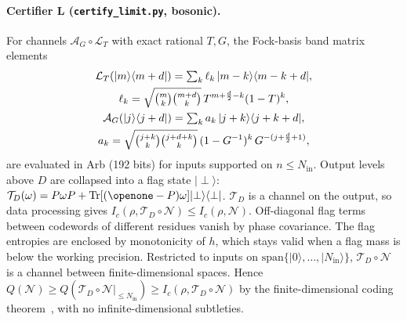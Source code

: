 \documentclass[aps,pra,reprint,superscriptaddress,nofootinbib,longbibliography,floatfix]{revtex4-2}
\theoremstyle{remark}
\newcommand{\ket}[1]{\lvert #1\rangle}
\newcommand{\bra}[1]{\langle #1\rvert}
\newcommand{\Tr}{\operatorname{Tr}}
\newcommand{\one}{\openone}
\newcommand{\Ic}{I_c}
\newcommand{\Amp}{\mathcal{A}}
\newcommand{\Loss}{\mathcal{L}}
\begin{document}
\paragraph*{Certifier L (\texttt{certify\_limit.py}, bosonic).} For channels $\Amp_G\circ\Loss_T$ with
exact rational $T,G$, the Fock-basis band matrix elements
\begin{gather*}
  \Loss_T(\ket m\bra{m+d})=\textstyle\sum_k\ell_k\,\ket{m-k}\bra{m-k+d},\\
  \ell_k=\sqrt{\tbinom mk\tbinom{m+d}k}\,T^{m+\frac d2-k}(1-T)^k,\\
  \Amp_G(\ket j\bra{j+d})=\textstyle\sum_k a_k\,\ket{j+k}\bra{j+k+d},\\
  a_k=\sqrt{\tbinom{j+k}k\tbinom{j+d+k}k}\,(1-G^{-1})^k\,G^{-(j+\frac d2+1)},
\end{gather*}
are evaluated in Arb (192 bits) for inputs supported on $n\le N_{\mathrm{in}}$. Output levels above $D$
are collapsed into a flag state $\ket\perp$: $\mathcal T_D(\omega)=P\omega P+\Tr[(\one-P)\omega]\ket\perp\bra\perp$.
$\mathcal T_D$ is a channel on the output, so data processing gives
$\Ic(\rho,\mathcal T_D\circ\mathcal N)\le\Ic(\rho,\mathcal N)$. Off-diagonal flag terms between codewords
of different residues vanish by phase covariance. The flag entropies are enclosed by monotonicity of
$h$, which stays valid when a flag mass is below the working precision. Restricted to inputs on
$\mathrm{span}\{\ket0,\dots,\ket{N_{\mathrm{in}}}\}$, $\mathcal T_D\circ\mathcal N$ is a channel between
finite-dimensional spaces. Hence $Q(\mathcal N)\ge Q(\mathcal T_D\circ\mathcal N|_{\le N_{\mathrm{in}}})\ge
\Ic(\rho,\mathcal T_D\circ\mathcal N)$ by the finite-dimensional coding
theorem~\cite{lloyd1997capacity,devetak2005private}, with no infinite-dimensional subtleties.
\end{document}
